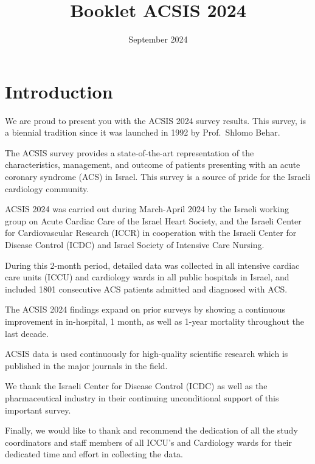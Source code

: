 \documentclass[
]{article}
\title{Booklet ACSIS 2024}
\author{}
\date{\vspace{-2.5em}September 2024}
\begin{document}
\maketitle

{
\setcounter{tocdepth}{2}
\tableofcontents
}
\captionsetup[table]{labelformat=empty}

\pagebreak

\section{Introduction}\label{introduction}

We are proud to present you with the ACSIS 2024 survey results. This
survey, is a biennial tradition since it was launched in 1992 by
Prof.~Shlomo Behar.

The ACSIS survey provides a state-of-the-art representation of the
characteristics, management, and outcome of patients presenting with an
acute coronary syndrome (ACS) in Israel. This survey is a source of
pride for the Israeli cardiology community.

ACSIS 2024 was carried out during March-April 2024 by the Israeli
working group on Acute Cardiac Care of the Israel Heart Society, and the
Israeli Center for Cardiovascular Research (ICCR) in cooperation with
the Israeli Center for Disease Control (ICDC) and Israel Society of
Intensive Care Nursing.

During this 2-month period, detailed data was collected in all intensive
cardiac care units (ICCU) and cardiology wards in all public hospitals
in Israel, and included 1801 consecutive ACS patients admitted and
diagnosed with ACS.

The ACSIS 2024 findings expand on prior surveys by showing a continuous
improvement in in-hospital, 1 month, as well as 1-year mortality
throughout the last decade.

ACSIS data is used continuously for high-quality scientific research
which is published in the major journals in the field.

We thank the Israeli Center for Disease Control (ICDC) as well as the
pharmaceutical industry in their continuing unconditional support of
this important survey.

Finally, we would like to thank and recommend the dedication of all the
study coordinators and staff members of all ICCU's and Cardiology wards
for their dedicated time and effort in collecting the data.

~

~
\end{document}
